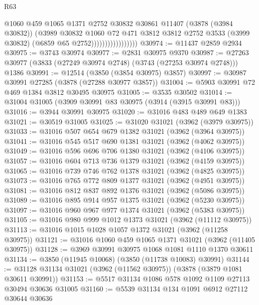 \begin{lexlean}{R63}
\begin{coremodule}
                                  @1060
                                  @459
                                  @1065
                                  @1371
                                  @2752
                                  @30832
                                  @30861
                                  @11407
                                  (@3878 (@3984 @30832))
                                  (@3989
                                    @30832
                                    @1060
                                    @72
                                    @471
                                    @3812
                                    @3812
                                    @2752
                                    @3533
                                    (@3999 @30832)
                                    (@6859 @65 @2752)))))))))))))))))
@30974 := @11437 @2859 @2934
@30975 := @3743 @30974
@30977 := @2831 @30975 @9370
@30987 := @27263 @30977 (@3833 (@27249 @30974 @2748) (@3743 (@27253 @30974 @2748))) @1386
@30991 := @12514 (@3850 (@3854 @30975) @3857)
@30997 := @30987 @30991 @27285 (@3878 (@27288 @30977 @3857))
@31004 := @5903 @30991 @72 @469 @1384 @3812 @30495 @30975
@31005 := @3535 @30502
@31014 := @31004 @31005 (@3909 @30991 @83 @30975 (@3914 (@3915 @30991 @83)))
@31016 := @3944 @30991 @30975
@31020 := @31016 @483 @489 @649 @1383
@31021 := @30519 @31005
@31025 := @31020 @31021 (@3962 (@3979 @30975))
@31033 := @31016 @507 @654 @679 @1382 @31021 (@3962 (@3964 @30975))
@31041 := @31016 @545 @517 @690 @1381 @31021 (@3962 (@4062 @30975))
@31049 := @31016 @596 @696 @706 @1380 @31021 (@3962 (@4106 @30975))
@31057 := @31016 @604 @713 @736 @1379 @31021 (@3962 (@4159 @30975))
@31065 := @31016 @739 @746 @762 @1378 @31021 (@3962 (@4825 @30975))
@31073 := @31016 @765 @772 @809 @1377 @31021 (@3962 (@4951 @30975))
@31081 := @31016 @812 @837 @892 @1376 @31021 (@3962 (@5086 @30975))
@31089 := @31016 @895 @914 @957 @1375 @31021 (@3962 (@5230 @30975))
@31097 := @31016 @960 @967 @977 @1374 @31021 (@3962 (@5383 @30975))
@31105 := @31016 @980 @999 @1012 @1373 @31021 (@3962 (@11112 @30975))
@31113 := @31016 @1015 @1028 @1057 @1372 @31021 (@3962 (@11258 @30975))
@31121 := @31016 @1060 @459 @1065 @1371 @31021 (@3962 (@11405 @30975))
@31128 := @3969 @30991 @30975 @1068 @1081 @1110 @1370 @30611
@31134 := @3850 (@11945 @10068) (@3850 (@11738 @10083) @30991)
@31144 := @31128 @31134 @31021 (@3962 (@11562 @30975)) (@3878 (@3879 @1081 @30611 @30991))
@31153 := @5517 @31134 @1086 @578 @1092 @1109 @27113 @30494 @30636 @31005
@31160 := @5539 @31134 @134 @1091 @6912 @27112 @30644 @30636

\end{coremodule}
\end{lexlean}
